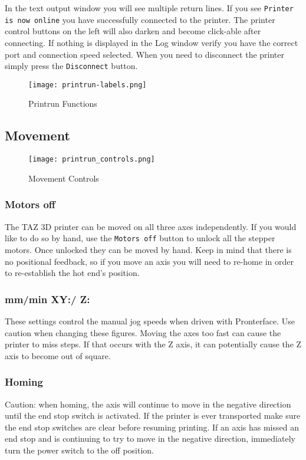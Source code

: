 In the text output window you will see multiple return lines. If you see \texttt{Printer is now online} you have successfully connected to the printer. The printer control buttons on the left will also darken and become click-able after connecting. If nothing is displayed in the Log window verify you have the correct port and connection speed selected. When you need to disconnect the printer simply press the \texttt{Disconnect} button.

\begin{figure}[H]
\centering
\texttt{[image: printrun-labels.png]}
\caption{Printrun Functions}
\label{fig:printrun-labels}
\end{figure}

\subsection{Movement} 
\begin{figure}[H]
\centering
\texttt{[image: printrun\_controls.png]}
\caption{Movement Controls}
\label{fig:printrun_controls}
\end{figure}

\subsubsection{Motors off}
The TAZ 3D printer can be moved on all three axes independently. If you would like to do so by hand, use the \texttt{Motors off} button to unlock all the stepper motors. Once unlocked they can be moved by hand. Keep in mind that there is no positional feedback, so if you move an axis you will need to re-home in order to re-establish the hot end's position. 

\subsubsection{mm/min XY:/ Z:}
These settings control the manual jog speeds when driven with Pronterface. Use caution when changing these figures. Moving the axes too fast can cause the printer to miss steps. If that occurs with the Z axis, it can potentially cause the Z axis to become out of square.

\subsubsection{Homing}
Caution: when homing, the axis will continue to move in the negative direction until the end stop switch is activated. If the printer is ever transported make sure the end stop switches are clear before resuming printing. If an axis has missed an end stop and is continuing to try to move in the negative direction, immediately turn the power switch to the off position. 

